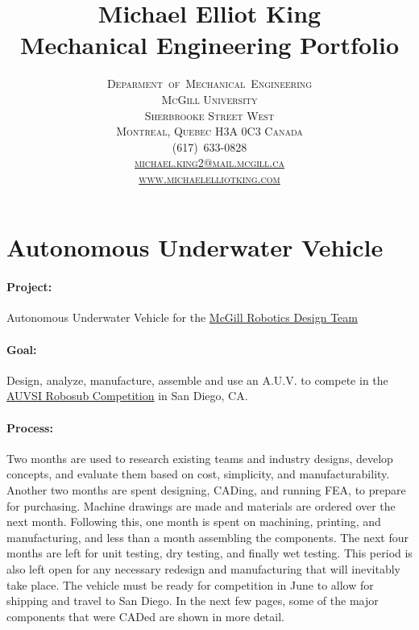 \documentclass[12pt, landscape]{article}
\title{\Huge Michael Elliot King\\[10pt]
Mechanical Engineering Portfolio}
\author{\scshape Deparment~of~Mechanical~Engineering\\
\scshape McGill University\\
\normalfont 817 Sherbrooke Street West\\
Montreal, Quebec H3A 0C3 Canada\\[20pt]
(617)~633-0828\\
\href{mailto:michael.king2@mail.mcgill.ca}{michael.king2@mail.mcgill.ca}\\
\href{http://www.michaelelliotking.com}{www.michaelelliotking.com}
}
\date{}
\begin{document}
\begin{titlepage}
\linespread{1}\maketitle
\thispagestyle{empty}
\end{titlepage}


\pagestyle{fancy}

\section{Autonomous Underwater Vehicle}
\paragraph{Project:} Autonomous Underwater Vehicle for the \href{http://www.mcgillrobotics.com}{McGill Robotics Design Team}
\paragraph{Goal:} Design, analyze, manufacture, assemble and use an A.U.V. to compete in the \href{http://www.robosub.org}{AUVSI Robosub Competition} in San Diego, CA.
\paragraph{Process:} Two months are used to research existing teams and industry designs, develop concepts, and evaluate them based on cost, simplicity, and manufacturability.  Another two months are spent designing, CADing, and running FEA, to prepare for purchasing.  Machine drawings are made and materials are ordered over the next month.  Following this, one month is spent on machining, printing, and manufacturing, and less than a month assembling the components.  The next four months are left for unit testing, dry testing, and finally wet testing.  This period is also left open for any necessary redesign and manufacturing that will inevitably take place.  The vehicle must be ready for competition in June to allow for shipping and travel to San Diego.
In the next few pages, some of the major components that were CADed are shown in more detail.
\end{document}
